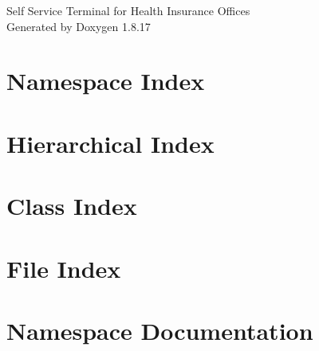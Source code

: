 \let\mypdfximage\pdfximage\def\pdfximage{\immediate\mypdfximage}\documentclass[twoside]{book}
\newcommand{\+}{\discretionary{\mbox{\scriptsize$\hookleftarrow$}}{}{}}
\newcommand{\clearemptydoublepage}{%
  \newpage{\pagestyle{empty}\cleardoublepage}%
}
\begin{document}
\hypersetup{pageanchor=false,
             bookmarksnumbered=true,
             pdfencoding=unicode
            }
\begin{titlepage}
\vspace*{7cm}
\begin{center}%
{\Large Self Service Terminal for Health Insurance Offices }\\
\vspace*{1cm}
{\large Generated by Doxygen 1.8.17}\\
\end{center}
\end{titlepage}
\clearemptydoublepage
{}
\tableofcontents
\clearemptydoublepage
{}
\hypersetup{pageanchor=true}

\chapter{Namespace Index}

\chapter{Hierarchical Index}

\chapter{Class Index}

\chapter{File Index}

\chapter{Namespace Documentation}
















\end{document}
